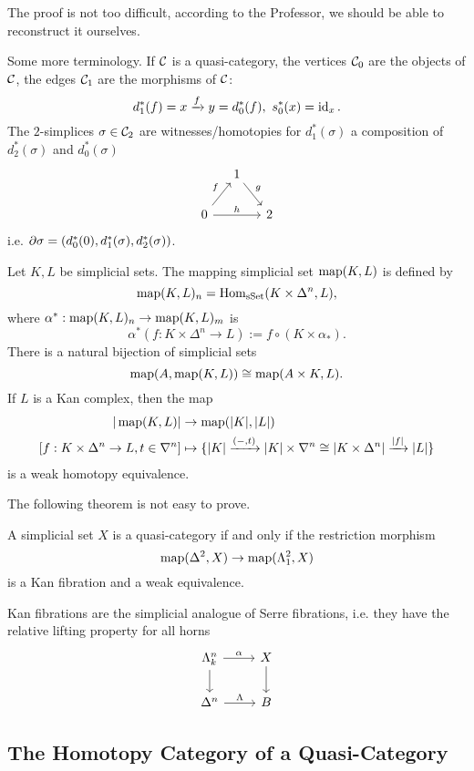 The proof is not too difficult, according to the Professor, we should be able to reconstruct it ourselves.

Some more terminology. If $\mathcal{C}$ is a quasi-category, the vertices $\mathcal{C}_0$ are the objects of $\mathcal{C}$, the edges $\mathcal{C}_1$ are the morphisms of $\mathcal{C}$:
\[d_1^*(f)=x\xrightarrow{f}y=d_0^*(f),\  s_0^*(x)=\operatorname{id}_x.\]
The $2$-simplices $\sigma\in\mathcal{C}_2$ are witnesses/homotopies for $d_1^*(\sigma)$ a composition of $d_2^*(\sigma)$ and $d_0^*(\sigma)$
\[
\begin{tikzcd}[column sep=small]
& 1 \ar[dr,"g"] & \\
0 \ar[ur,"f"] \ar[rr,"h"] & & 2
\end{tikzcd}
\]
i.e. $\partial\sigma=(d_0^*(0),d_1^*(\sigma),d_2^*(\sigma))$.

Let $K,L$ be simplicial sets. The mapping simplicial set $\operatorname{map}(K,L)$ is defined by
\[\operatorname{map}(K,L)_n=\operatorname{Hom}_{\mathrm{sSet}}(K\times\Delta^n,L),\]
where $\alpha^*:\operatorname{map}(K,L)_n\to\operatorname{map}(K,L)_m$ is
\[\alpha^*(f:K\times\Delta^n\to L):=f\circ(K\times\alpha_*).\]
There is a natural bijection of simplicial sets
\[\operatorname{map}(A,\operatorname{map}(K,L))\cong\operatorname{map}(A\times K,L).\]
If $L$ is a Kan complex, then the map
\begin{align*}
    |\map(K,L)|&\to\map(|K|,|L|)\\
    [f:K\times\Delta^n\to L,t\in\sx{n}]&\mapsto\cb{|K|\xto{(-,t)}|K|\times\sx{n}\cong|K\times\Delta^n|\xto{|f|}|L|}
\end{align*}
is a weak homotopy equivalence.

The following theorem is not easy to prove.

\begin{theorem}[Joyal]
A simplicial set $X$ is a quasi-category if and only if the restriction morphism
\[\operatorname{map}(\Delta^2,X)\to\operatorname{map}(\Lambda^2_1,X)\]
is a Kan fibration and a weak equivalence.
\end{theorem}

Kan fibrations are the simplicial analogue of Serre fibrations, i.e. they have the relative lifting property for all horns
\[
\begin{tikzcd}
\Lambda^n_k \ar[d] \ar[r,"\alpha"] & X \ar[d]\\
\Delta^n \ar[r,"\Lambda"] & B
\end{tikzcd}
\]

\subsection{The Homotopy Category of a Quasi-Category}

